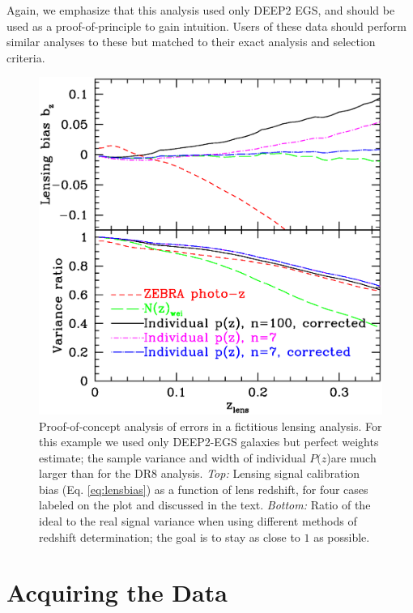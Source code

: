 \documentclass[preprint]{aastex}
\newcommand{\pofz}{$P(z$)}
\begin{document}
Again, we emphasize that this analysis used only DEEP2 EGS, and should be used
as a proof-of-principle to gain intuition.  Users of these data should perform
similar analyses to these but matched to their exact analysis and selection
criteria.

\begin{figure} [h]\centering
    \includegraphics[scale=0.5]{figures/pz.egs.c3n7.paper.ps}

    \caption{ Proof-of-concept analysis of errors in a fictitious lensing
    analysis.  For this example we used only DEEP2-EGS galaxies but perfect
    weights estimate; the sample variance and width of individual \pofz are
    much larger than for the DR8 analysis.  {\em Top:} Lensing signal
    calibration bias (Eq.  \ref{eq:lensbias}) as a function of lens redshift,
    for four  cases labeled on the plot and discussed in the text.  {\em
    Bottom:}  Ratio of the ideal to the real signal variance when using
    different  methods of redshift determination; the goal is to stay as close
    to $1$  as possible. \label{fig:simplebias}}

\end{figure}



\section{Acquiring the Data} \label{sec:get}
\end{document}
